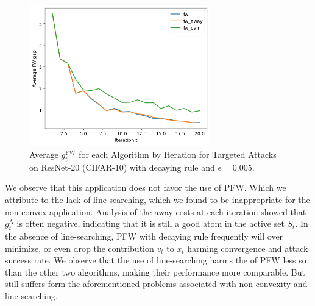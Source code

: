 \documentclass{article}
\begin{document}
\begin{figure}[H]
    \centering
    \includegraphics[width=0.7\textwidth]{plots/mdl_compare_avg_FWgap_by_iter.png}
    \caption{Average $g^\text{FW}_t$ for each Algorithm by Iteration for Targeted Attacks on ResNet-20 (CIFAR-10) with decaying rule and $\epsilon = 0.005$.}
    \label{fig:converge-compare}
\end{figure}

We observe that this application does not favor the use of PFW. Which we attribute to the lack of line-searching, which we found to be inappropriate for the non-convex application. Analysis of the away costs at each iteration showed that $g_t^\text{A}$ is often negative, indicating that it is still a good atom in the active set $S_t$. In the absence of line-searching, PFW with decaying rule frequently will over minimize, or even drop the contribution $v_t$ to $x_t$ harming convergence and attack success rate. We observe that the use of line-searching harms the  of PFW less so than the other two algorithms, making their performance more comparable. But still suffers form the aforementioned problems associated with non-convexity and line searching.
\end{document}
